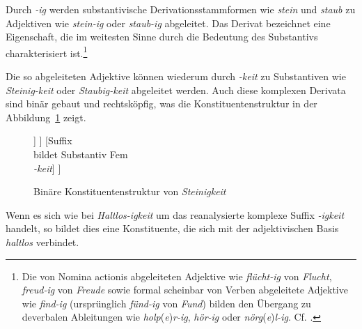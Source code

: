\label{subsubsection:ig}

Durch \textit{-ig} werden substantivische Derivationsstammformen wie \textit{stein} und \textit{staub} zu Adjektiven wie \textit{stein-ig} oder \textit{staub-ig} abgeleitet. Das Derivat bezeichnet eine Eigenschaft, die im weitesten Sinne durch die Bedeutung des Substantivs charakterisiert ist.\footnote{Die von Nomina actionis abgeleiteten Adjektive wie \textit{flücht-ig} von \textit{Flucht}, \textit{freud-ig} von \textit{Freude} sowie formal scheinbar von Verben abgeleitete Adjektive wie \textit{find-ig} (ursprünglich \textit{fünd-ig} von \textit{Fund}) bilden den Übergang zu deverbalen Ableitungen wie \textit{holp}(\textit{e})\textit{r-ig}, \textit{hör-ig} oder \textit{nörg}(\textit{e})\textit{l-ig}. Cf. \citet[95]{Paul1920Wb}.}

Die so abgeleiteten Adjektive können wiederum durch \textit{-keit} zu Substantiven wie \textit{Steinig-keit} oder \textit{Staubig-keit} abgeleitet werden. Auch diese komplexen Derivata sind binär gebaut und rechtsköpfig, was die Konstituentenstruktur in der Abbildung~\ref{Abb:Steinigkeit} zeigt.

	\begin{figure}
	\centering
	\begin{forest}
	[Stammform \\ Substantiv Fem \\ \textit{Steinigkeit} [Derivationsstammform \\ Adjektiv \\ \textit{steinig} [Stammform \\ Adjektiv \\ \textit{steinig} [Derivationsstammform \\ Substantiv Mask \\ \textit{stein}] [Suffix \\ bildet Adjektiv \\ \textit{-ig}]   ]  ] [Suffix \\ bildet Substantiv Fem \\ \textit{-keit}]  ]
	\end{forest}
	\caption{Binäre Konstituentenstruktur von \textit{Steinigkeit}}\label{Abb:Steinigkeit}
\end{figure}

Wenn es sich wie bei \textit{Haltlos-igkeit} um das reanalysierte komplexe Suffix \textit{-igkeit} handelt, so bildet dies eine Konstituente, die sich mit der adjektivischen Basis \textit{haltlos} verbindet.  

